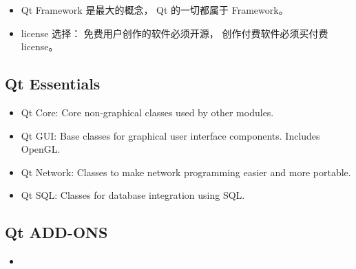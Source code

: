 
\begin{issues}
\issueDraft
\end{issues}

\begin{itemize}
\item Qt Framework 是最大的概念， Qt 的一切都属于 Framework。
\item license 选择： 免费用户创作的软件必须开源， 创作付费软件必须买付费 license。
\end{itemize}


\subsection{Qt Essentials}
\begin{itemize}
\item Qt Core: Core non-graphical classes used by other modules.
\item Qt GUI: Base classes for graphical user interface components. Includes OpenGL.
\item Qt Network: Classes to make network programming easier and more portable.
\item Qt SQL: Classes for database integration using SQL.
\end{itemize}

\subsection{Qt ADD-ONS}
\begin{itemize}
\item 
\end{itemize}
